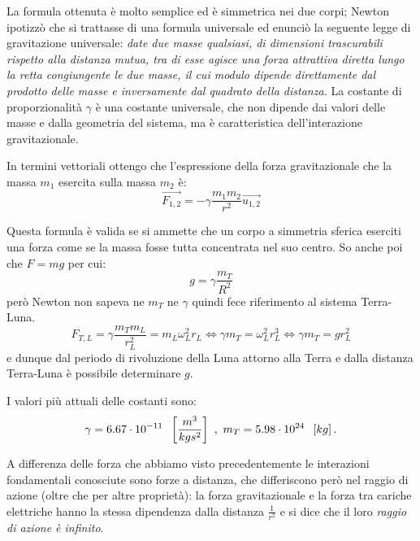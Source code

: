 \documentclass[class=book, crop=false, oneside, 12pt]{standalone}
\begin{document}
La formula ottenuta è molto semplice ed è simmetrica nei due corpi; 
Newton ipotizzò che si trattasse di una formula universale ed enunciò la seguente legge di gravitazione universale: \newline
\emph{date due masse qualsiasi, di dimensioni trascurabili rispetto alla distanza mutua, tra di esse agisce una forza attrattiva diretta lungo la retta congiungente le due masse, il cui modulo dipende direttamente dal prodotto delle masse e inversamente dal quadrato della distanza.}\newline
La costante di proporzionalità \(\gamma\) è una costante universale, che non dipende dai valori delle masse e dalla geometria del sistema, ma è caratteristica dell'interazione gravitazionale.

In termini vettoriali ottengo che l'espressione della forza gravitazionale che la massa \(m_1\) esercita sulla massa \(m_2\) è:
\begin{equation}
    \overrightarrow{F_{1,2}} = - \gamma \frac{m_1 m_2}{r^2} \overrightarrow{u_{1,2}}
\end{equation}

Questa formula è valida se si ammette che un corpo a simmetria sferica eserciti una forza come se la massa fosse tutta concentrata nel suo centro.
So anche poi che \(F = mg\) per cui:
\begin{equation}
    g = \gamma \frac{m_T}{R^2}
\end{equation}
però Newton non sapeva ne \(m_T\) ne \(\gamma\) quindi fece riferimento al sistema Terra-Luna.
\begin{equation}
    F_{T,L} = \gamma \frac{m_T m_L}{r_L^2} = m_L \omega_L^2 r_L \Leftrightarrow \gamma m_T = \omega_L^2 r_L^3 \Leftrightarrow \gamma m_T = g r_L^2
\end{equation}
e dunque dal periodo di rivoluzione della Luna attorno alla Terra e dalla distanza Terra-Luna è possibile determinare \(g\).

I valori più attuali delle costanti sono:
\begin{equation*}
    \gamma = 6.67 \cdot 10^{-11} \hspace{0.2cm} \left[\frac{m^3}{kg s^2}\right] \ , \ m_T = 5.98 \cdot 10^{24} \hspace{0.2cm} \left[kg\right] .
\end{equation*}

A differenza delle forza che abbiamo visto precedentemente le interazioni fondamentali conosciute sono forze a distanza, che differiscono però nel raggio di azione (oltre che per altre proprietà): 
la forza gravitazionale e la forza tra cariche elettriche hanno la stessa dipendenza dalla distanza $\frac{1}{r^2}$ e si dice che il loro \emph{raggio di azione è infinito}.
\end{document}
